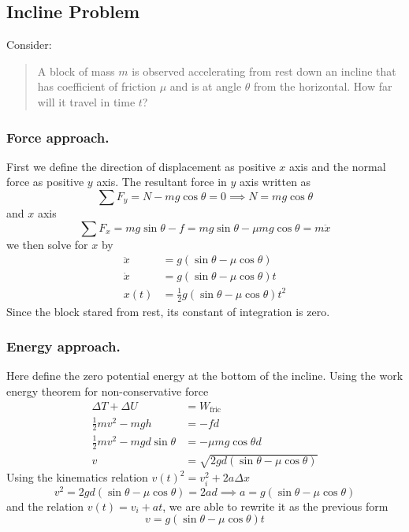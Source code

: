 \documentclass[../../../main.tex]{subfiles}
\begin{document}
\subsection*{Incline Problem}
Consider:
\begin{quotation}
    A block of mass $m$ is observed accelerating from rest down an incline that has coefficient of friction $\mu$ and is at angle $\theta$ from the horizontal. How far will it travel in time $t$?
\end{quotation}
\begin{figure*}[h]
    \centering
\end{figure*}

\subsubsection*{Force approach.}
First we define the direction of displacement as positive $x$ axis and the normal force as positive $y$ axis. The resultant force in $y$ axis written as 
\begin{equation*}
    \sum F_y=N-mg\cos\theta=0 \implies N=mg\cos \theta
\end{equation*}
and $x$ axis
\begin{equation*}
    \sum F_x=mg\sin\theta -f= mg\sin\theta -\mu mg\cos \theta=m\ddot{x}
\end{equation*}
we then solve for $x$ by 
\begin{align*}
    \ddot{x}&=g\left(\sin\theta -\mu \cos \theta\right)\\
    \dot{x}&=g\left(\sin\theta -\mu \cos \theta\right)t\\
    x(t)&=\frac{1}{2}g\left(\sin\theta -\mu \cos \theta\right)t^2
\end{align*}
Since the block stared from rest, its constant of integration is zero.

\subsubsection*{Energy approach.}
Here define the zero potential energy at the bottom of the incline. 
Using the work energy theorem for non-conservative force
\begin{align*}
    \Delta T+\Delta U&=W_\text{fric}\\
    \frac{1}{2}mv^2-mgh&=-fd\\
    \frac{1}{2}mv^2-mgd\sin\theta&=-\mu mg\cos\theta d\\
    v&=\sqrt{2gd(\sin\theta-\mu\cos\theta)}
\end{align*}
Using the kinematics relation $v(t)^2=v_i^2+2a\Delta x$ 
\begin{equation*}
    v^2=2gd(\sin\theta-\mu\cos\theta)=2ad\implies a=g(\sin\theta-\mu\cos\theta)
\end{equation*}
and the relation $v(t)=v_i+at$, we are able to rewrite it as the previous form
\begin{equation*}
   v=g(\sin\theta-\mu\cos\theta)t 
\end{equation*}
\end{document}
